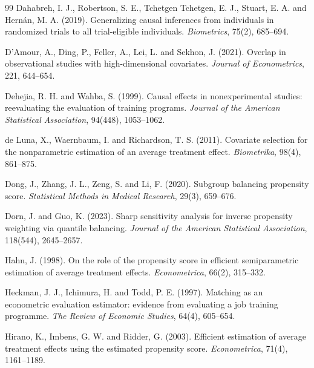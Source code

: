 \documentclass[twoside,11pt]{article}
\theoremstyle{plain}
\theoremstyle{definition}
\begin{document}
\begin{thebibliography}{99}
 Dahabreh, I. J., Robertson, S. E., Tchetgen Tchetgen, E. J., Stuart, E. A. and Hernán, M. A. (2019). Generalizing causal inferences from individuals in randomized trials to all trial-eligible individuals. \emph{Biometrics}, 75(2), 685--694.

 D'Amour, A., Ding, P., Feller, A., Lei, L. and Sekhon, J. (2021). Overlap in observational studies with high-dimensional covariates. \emph{Journal of Econometrics}, 221, 644--654.

 Dehejia, R. H. and Wahba, S. (1999). Causal effects in nonexperimental studies: reevaluating the evaluation of training programs. \emph{Journal of the American Statistical Association}, 94(448), 1053--1062.

 de Luna, X., Waernbaum, I. and Richardson, T. S. (2011). Covariate selection for the nonparametric estimation of an average treatment effect. \emph{Biometrika}, 98(4), 861--875.

 Dong, J., Zhang, J. L., Zeng, S. and Li, F. (2020). Subgroup balancing propensity score. \emph{Statistical Methods in Medical Research}, 29(3), 659--676.

 Dorn, J. and Guo, K. (2023). Sharp sensitivity analysis for inverse propensity weighting via quantile balancing. \emph{Journal of the American Statistical Association}, 118(544), 2645--2657.

 Hahn, J. (1998). On the role of the propensity score in efficient semiparametric estimation of average treatment effects. \emph{Econometrica}, 66(2), 315--332.

 Heckman, J. J., Ichimura, H. and Todd, P. E. (1997). Matching as an econometric evaluation estimator: evidence from evaluating a job training programme. \emph{The Review of Economic Studies}, 64(4), 605--654.

 Hirano, K., Imbens, G. W. and Ridder, G. (2003). Efficient estimation of average treatment effects using the estimated propensity score. \emph{Econometrica}, 71(4), 1161--1189.


\end{thebibliography}
\end{document}

